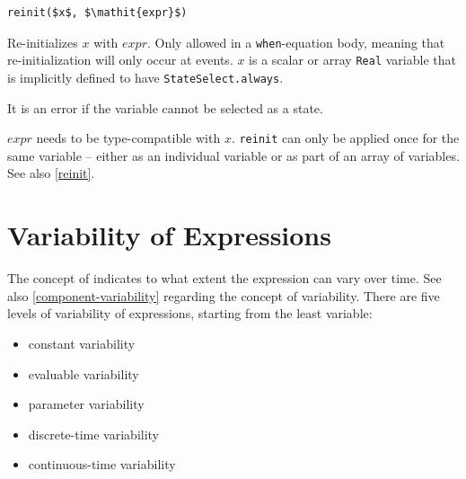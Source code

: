 \begin{operatordefinition}[reinit]
\begin{synopsis}\begin{lstlisting}
reinit($x$, $\mathit{expr}$)
\end{lstlisting}\end{synopsis}
\begin{semantics}
Re-initializes $x$ with $\mathit{expr}$.
Only allowed in a \lstinline!when!-equation body, meaning that re-initialization will only occur at events.
$x$ is a scalar or array \lstinline!Real! variable that is implicitly defined to have \lstinline!StateSelect.always!.
\begin{nonnormative}
It is an error if the variable cannot be selected as a state.
\end{nonnormative}
$\mathit{expr}$ needs to be type-compatible with $x$.
\lstinline!reinit! can only be applied once for the same variable -- either as an individual variable or as part of an array of variables.
See also \cref{reinit}.
\end{semantics}
\end{operatordefinition}

\section{Variability of Expressions}\label{variability-of-expressions}

The concept of  indicates to what extent the expression can vary over time.
See also \cref{component-variability} regarding the concept of variability.
There are five levels of variability of expressions, starting from the least variable:
\begin{itemize}
\item
  constant variability
\item
  evaluable variability
\item
  parameter variability
\item
  discrete-time variability
\item
  continuous-time variability
\end{itemize}

